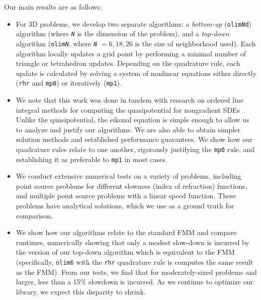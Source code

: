 \documentclass[eikonal.tex]{subfiles}
\begin{document}
Our main results are as follows:
\begin{itemize}
\item For 3D problems, we develop two separate algorithms: a
  \emph{bottom-up} (\texttt{olim\emph{N}d}) algorithm (where
  \texttt{\emph{N}} is the dimension of the problem), and a
  \emph{top-down} algorithm (\texttt{olim\emph{N}}, where
  \texttt{\emph{N}} \hspace{-0.1em}$=6,18,26$ is the size of
  neighborhood used). Each algorithm locally updates a grid point by
  performing a minimal number of triangle or tetrahedron
  updates. Depending on the quadrature rule, each update is calculated
  by solving a system of nonlinear equations either directly
  (\texttt{rhr} and \texttt{mp0}) or iteratively (\texttt{mp1}).
\item We note that this work was done in tandem with research on
  ordered line integral methods for computing the quasipotential for
  nongradient
  SDEs~\cite{dahiya2017ordered,yang2019computing,dahiya2018ordered}. Unlike
  the quasipotential, the eikonal equation is simple enough to allow
  us to analyze and justify our algorithms. We are also able to obtain
  simpler solution methods and established performance guarantees. We
  show how our quadrature rules relate to one another, rigorously
  justifying the \texttt{mp0} rule, and establishing it as preferable
  to \texttt{mp1} in most cases.
\item We conduct extensive numerical tests on a variety of problems,
  including point source problems for different slowness (index of
  refraction) functions, and multiple point source problems with a
  linear speed function. These problems have analytical solutions,
  which we use as a ground truth for comparison.
\item We show how our algorithms relate to the standard FMM and
  compare runtimes, numerically showing that only a modest slow-down
  is incurred by the version of our top-down algorithm which is
  equivalent to the FMM (specifically, \texttt{olim6} with the
  \texttt{rhr} quadrature rule is computes the same result as the
  FMM). From our tests, we find that for moderately-sized problems and
  larger, less than a 15\% slowdown is incurred. As we continue to
  optimize our library, we expect this disparity to shrink.
\end{itemize}
\end{document}
